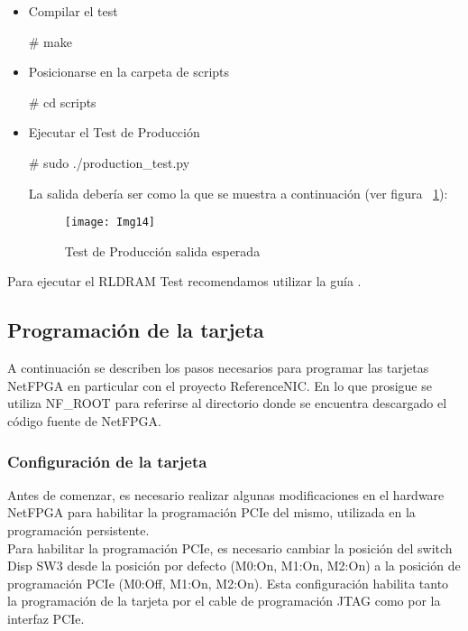 \begin{itemize}
\begin{itemize}
\item Compilar el test
\begin{bash}
# make
\end{bash}

\item Posicionarse en la carpeta de scripts
\begin{bash}
# cd scripts
\end{bash}

\item Ejecutar el Test de Producción
\begin{bash}
# sudo ./production_test.py
\end{bash}

La salida debería ser como la que se muestra a continuación (ver figura ~\ref{fig:Img14}):

\newpage
\begin{figure}[htbp!] 
\centering    
\texttt{[image: Img14]}
\caption[Test de Producción salida esperada]{Test de Producción salida esperada}
\label{fig:Img14}
\end{figure}
\end{itemize}

\end{itemize}

Para ejecutar el RLDRAM Test recomendamos utilizar la guía \citep{NetFPGA8}.

\subsection{Programación de la tarjeta}

A continuación se describen los pasos necesarios para programar las tarjetas NetFPGA en particular con el proyecto ReferenceNIC. En lo que prosigue se utiliza NF\_ROOT para referirse al directorio donde se encuentra descargado el código fuente de NetFPGA.

\subsubsection{Configuración de la tarjeta}
Antes de comenzar, es necesario realizar algunas modificaciones en el hardware NetFPGA para habilitar la programación PCIe del mismo, utilizada en la programación persistente.\\ 

Para habilitar la programación PCIe, es necesario cambiar la posición del switch Disp SW3 desde la posición por defecto (M0:On, M1:On, M2:On) a la posición de programación PCIe (M0:Off, M1:On, M2:On). Esta configuración habilita tanto la programación de la tarjeta por el cable de programación JTAG como por la interfaz PCIe.\\


